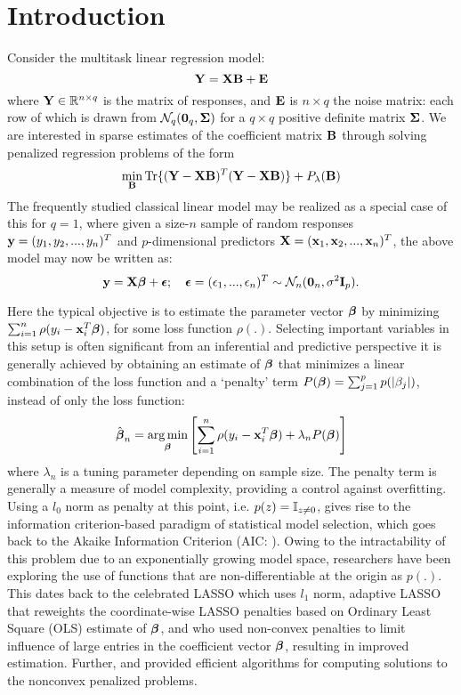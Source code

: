\section{Introduction}

Consider the multitask linear regression model:
%
$$ {\mathbf{Y}} = {\mathbf{X}} {\mathbf{B}} + {\mathbf{E}} $$
%
where ${\mathbf{Y}} \in \mathbb R^{n\times q}$ is the matrix of responses, and ${\mathbf{E}}$ is $n\times q$ the noise matrix: each row of which is drawn from $\mathcal{N}_q ({\bf 0}_q, {\boldsymbol{\Sigma}})$ for a $q \times q$ positive definite matrix ${\boldsymbol{\Sigma}}$. We are interested in sparse estimates of the coefficient matrix ${\mathbf{B}}$ through solving penalized regression problems of the form
%
\begin{equation}\label{eqn:penEqn}
\min_{\mathbf{B}} \operatorname*{Tr} \{ ({\mathbf{Y}} - {\mathbf{X}}{\mathbf{B}})^T ( {\mathbf{Y}} - {\mathbf{X}}{\mathbf{B}}) \} + P_\lambda({\mathbf{B}})
\end{equation}
%
The frequently studied classical linear model may be realized as a special case of this 
for $q = 1$, where given a size-$n$ sample of random responses ${\bf{y}} = (y_1, y_2, ..., y_n)^T$ and $p$-dimensional predictors ${\mathbf{X}} = ({\bf{x}}_1, {\bf{x}}_2, ...,{\bf{x}}_n)^T$, the 
above model may now be written as:
%
$$
{\bf{y}} = {\mathbf{X}} {\boldsymbol{\beta}} + {\boldsymbol{\epsilon}}; \quad {\boldsymbol{\epsilon}} = (\epsilon_1,...,\epsilon_n)^T \sim \mathcal N_n ({\bf 0}_n, \sigma^2{\mathbf{I}}_p).
$$
%

Here the typical objective is to estimate the parameter vector ${\boldsymbol{\beta}}$ by minimizing $\sum_{i=1}^n \rho ( y_i - {\bf{x}}_i^T {\boldsymbol{\beta}})$, for some loss function $\rho(.)$. Selecting important variables in this setup is often significant from an inferential and predictive perspective it is generally achieved by obtaining an estimate of ${\boldsymbol{\beta}}$ that minimizes a linear combination of the loss function and a `penalty' term $P({\boldsymbol{\beta}}) = \sum_{j=1}^p p(|\beta_j|)$, instead of only the loss function:
%
\begin{equation}\label{eqn:eqn01}
\hat{{\boldsymbol{\beta}}}_n = \operatorname*{arg\,min}_{\boldsymbol{\beta}} \left[ \sum_{i=1}^n \rho ( y_i - {\bf{x}}_i^T {\boldsymbol{\beta}}) + \lambda_n P({\boldsymbol{\beta}}) \right]
\end{equation}
%
where $\lambda_n$ is a tuning parameter depending on sample size. The penalty term is generally a measure of model complexity, providing a control against overfitting. Using a $l_0$ norm as penalty at this point, i.e. $p(z) = {\mathbb{I}}_{z \neq 0}$, gives rise to the information criterion-based paradigm of statistical model selection, which goes back to the Akaike Information Criterion (AIC: \cite{Akaike70}). Owing to the intractability of this problem due to an exponentially growing model space, researchers have been exploring the use of functions that are non-differentiable at the origin as $p(.)$. This dates back to the celebrated LASSO \citep{Tibshirani96} which uses $l_1$ norm, adaptive LASSO \citep{Zou06} that reweights the coordinate-wise LASSO penalties based on Ordinary Least Square (OLS) estimate of ${\boldsymbol{\beta}}$, and \cite{FanLi01,CHZhang10} who used non-convex penalties to limit influence of large entries in the coefficient vector ${\boldsymbol{\beta}}$, resulting in improved estimation. Further, \cite{ZouLi08} and \cite{WangKimLi13} provided efficient algorithms for computing solutions to the nonconvex penalized problems.

